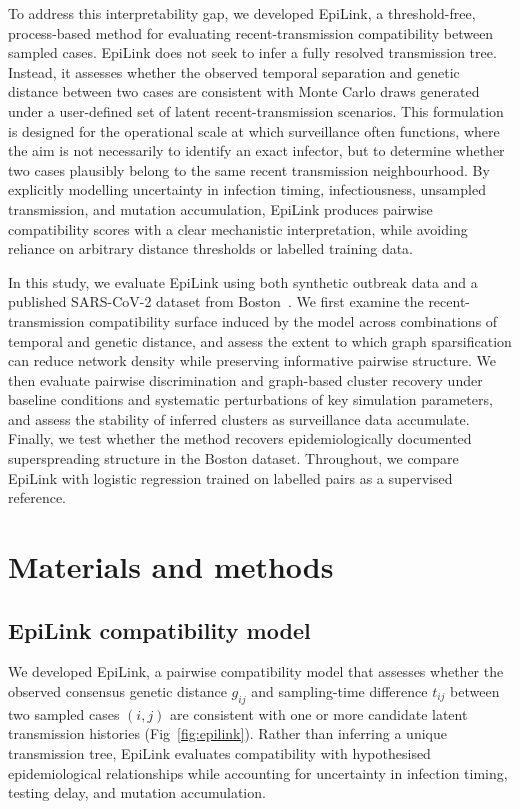 \documentclass[10pt,letterpaper]{article}
\begin{document}
To address this interpretability gap, we developed EpiLink, a threshold-free, process-based method for evaluating recent-transmission compatibility between sampled cases. EpiLink does not seek to infer a fully resolved transmission tree. Instead, it assesses whether the observed temporal separation and genetic distance between two cases are consistent with Monte Carlo draws generated under a user-defined set of latent recent-transmission scenarios. This formulation is designed for the operational scale at which surveillance often functions, where the aim is not necessarily to identify an exact infector, but to determine whether two cases plausibly belong to the same recent transmission neighbourhood. By explicitly modelling uncertainty in infection timing, infectiousness, unsampled transmission, and mutation accumulation, EpiLink produces pairwise compatibility scores with a clear mechanistic interpretation, while avoiding reliance on arbitrary distance thresholds or labelled training data.

In this study, we evaluate EpiLink using both synthetic outbreak data and a published SARS-CoV-2 dataset from Boston~\cite{Lemieux2021}. We first examine the recent-transmission compatibility surface induced by the model across combinations of temporal and genetic distance, and assess the extent to which graph sparsification can reduce network density while preserving informative pairwise structure. We then evaluate pairwise discrimination and graph-based cluster recovery under baseline conditions and systematic perturbations of key simulation parameters, and assess the stability of inferred clusters as surveillance data accumulate. Finally, we test whether the method recovers epidemiologically documented superspreading structure in the Boston dataset. Throughout, we compare EpiLink with logistic regression trained on labelled pairs as a supervised reference.

\section*{Materials and methods}

\subsection*{EpiLink compatibility model}

We developed EpiLink, a pairwise compatibility model that assesses whether the observed consensus genetic distance $g_{ij}$ and sampling-time difference $t_{ij}$ between two sampled cases $(i,j)$ are consistent with one or more candidate latent transmission histories (Fig~\ref{fig:epilink}). Rather than inferring a unique transmission tree, EpiLink evaluates compatibility with hypothesised epidemiological relationships while accounting for uncertainty in infection timing, testing delay, and mutation accumulation.
\end{document}
